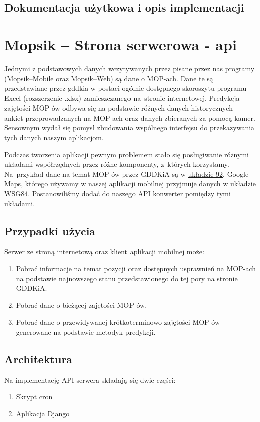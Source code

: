 \section{Dokumentacja użytkowa i opis implementacji}

\chapter{Mopsik -- Strona serwerowa - \acrshort{api}}\label{r:apka} 

Jednymi z podstawowych danych wczytywanych przez pisane przez nas programy (Mopsik--Mobile oraz Mopsik--Web) są dane o MOP-ach. Dane te są przedstawiane przez \acrshort{gddkia} w postaci ogólnie dostępnego skoroszytu programu Excel (rozszerzenie .xlsx) zamieszczanego na~stronie internetowej.
Predykcja zajętości MOP-ów odbywa się na podstawie różnych danych historycznych -- ankiet przeprowadzanych na MOP-ach oraz danych zbieranych za pomocą kamer.
Sensownym wydał się pomysł zbudowania wspólnego interfejsu do przekazywania tych danych naszym aplikacjom. 

Podczas tworzenia aplikacji pewnym problemem stało się posługiwanie różnymi układami współrzędnych przez różne komponenty, z~których korzystamy. Na~przykład dane na temat MOP-ów przez GDDKiA są w \href{https://pl.wikipedia.org/wiki/Uk\%C5\%82ad_wsp\%C3\%B3\%C5\%82rz\%C4\%99dnych_1992}{układzie 92}, Google Maps, którego używamy w naszej aplikacji mobilnej przyjmuje danych w układzie \href{https://pl.wikipedia.org/wiki/System_odniesienia_WGS_84}{WSG84}. Postanowiliśmy dodać do naszego API konwerter pomiędzy tymi układami.
\section{Przypadki użycia}
Serwer ze stroną internetową oraz klient aplikacji mobilnej może:
\begin{enumerate}
\item Pobrać informacje na temat pozycji oraz dostępnych usprawnień na MOP-ach na podstawie najnowszego stanu przedstawionego do tej pory na stronie GDDKiA.
\item Pobrać dane o bieżącej zajętości MOP-ów.
\item Pobrać dane o przewidywanej krótkoterminowo zajętości MOP-ów generowane na podstawie metodyk predykcji.
\end{enumerate}
\section{Architektura}
Na implementację API serwera składają się dwie części:
\begin{enumerate}
\item Skrypt cron
\item Aplikacja Django
\end{enumerate}
